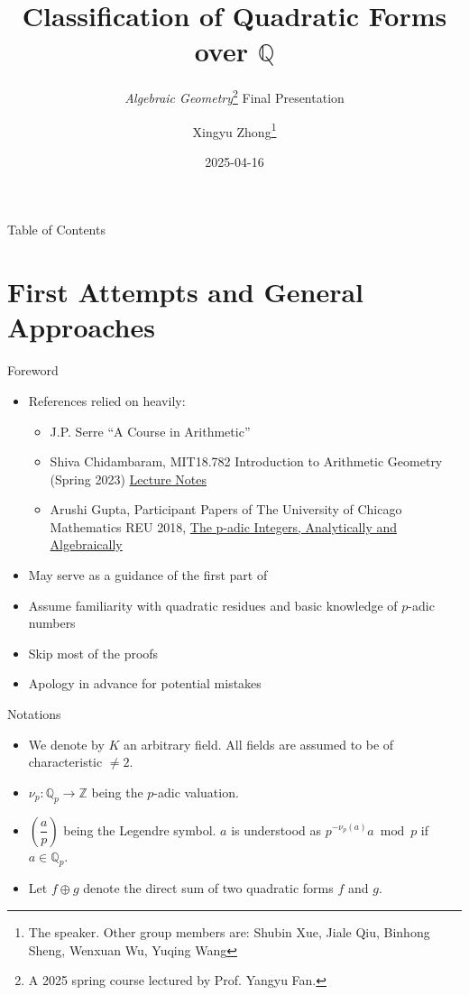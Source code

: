 \documentclass[fontset=fandol,envcountsect]{ctexbeamer}
\title{Classification of Quadratic Forms over \(\mathbb Q\)}
\subtitle{\textit{Algebraic Geometry}\thanks{A 2025 spring course lectured by Prof. Yangyu Fan.}
Final Presentation}
\author{Xingyu
Zhong\thanks{The speaker. Other group members are: Shubin Xue, Jiale Qiu, Binhong Sheng, Wenxuan Wu, Yuqing Wang}}
\institute[BIT]{Beijing Institute of Technology}
\date{2025-04-16}
\def\transtoc{目录}
\def\transtoc{Table of Contents}
\theoremstyle{theorem}
\theoremstyle{example}
\theoremstyle{remark}
\theoremstyle{theorem}
\theoremstyle{example}
\theoremstyle{remark}
\let\textbf\alert
\begin{document}
\frame{\titlepage}

\begin{frame}{\transtoc}
  \tableofcontents
\end{frame}

\section{First Attempts and General
Approaches}\label{first-attempts-and-general-approaches}

\begin{frame}{Foreword}
\label{foreword}
\newcommand{\T}{\mathrm{T}}
\newcommand{\Image}{\operatorname{Im}}
\newcommand{\rk}{\operatorname{rk}}
\newcommand{\sgn}{\operatorname{sgn}}
\newcommand{\rad}{\operatorname{rad}}

\begin{itemize}
\item
  References relied on heavily:

  \begin{itemize}
  \item
    J.P. Serre ``A Course in Arithmetic'' \autocite{serre_course_1973}
  \item
    Shiva Chidambaram, MIT18.782 Introduction to Arithmetic Geometry
    (Spring 2023)
    \href{https://math.mit.edu/classes/18.782/2023sp/LectureNotes9.pdf}{Lecture
    Notes}
  \item
    Arushi Gupta, Participant Papers of The University of Chicago
    Mathematics REU 2018,
    \href{https://math.uchicago.edu/~may/REU2018/REUPapers/Gupta.pdf}{The
    p-adic Integers, Analytically and Algebraically}
  \end{itemize}
\item
  May serve as a guidance of the first part of
  \autocite{serre_course_1973}
\item
  Assume familiarity with quadratic residues and basic knowledge of
  \(p\)-adic numbers
\item
  Skip most of the proofs
\item
  Apology in advance for potential mistakes
\end{itemize}
\end{frame}

\begin{frame}{Notations}
\label{notations}
\begin{itemize}
\item
  We denote by \(K\) an arbitrary field. \textbf{All fields are assumed
  to be of characteristic \(\neq 2\)}.
\item
  \(\nu_p : \mathbb Q_p \to \mathbb Z\) being the \(p\)-adic valuation.
\item
  \(\left(\dfrac a p \right)\) being the Legendre symbol. \(a\) is
  understood as \(p^{-\nu_p(a)} a \bmod p\) if \(a \in \mathbb Q_p\).
\item
  Let \(f \oplus g\) denote the direct sum of two quadratic forms \(f\)
  and \(g\).
\end{itemize}
\end{frame}
\end{document}
